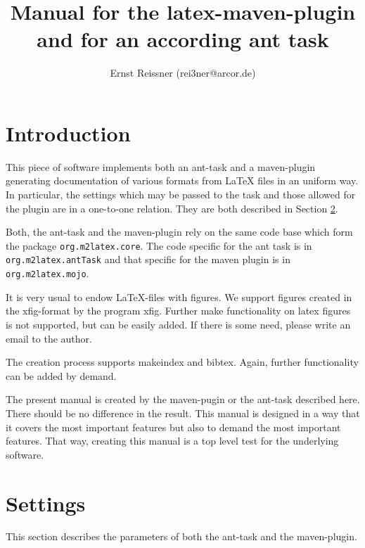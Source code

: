 \documentclass[12pt]{article}
\title{Manual for the latex-maven-plugin and for an according ant task }
\author{Ernst Reissner (rei3ner@arcor.de)}
\begin{document}
\maketitle

\tableofcontents

\section{Introduction}

This piece of software implements both an ant-task and a maven-plugin 
generating documentation of various formats from LaTeX files 
in an uniform way. 
In particular, the settings which may be passed to the task 
and those allowed for the plugin are in a one-to-one relation. 
They are both described in Section \ref{sec:settings}. 

Both, the ant-task and the maven-plugin rely on the same code base 
which form the package {\tt org.m2latex.core}. 
The code specific for the ant task is in {\tt org.m2latex.antTask} 
and that specific for the maven plugin is in {\tt org.m2latex.mojo}. 

It is very usual to endow LaTeX-files with figures. 
We support figures created in the xfig-format 
by the program xfig. 
Further make functionality on latex figures is not supported, 
but can be easily added. 
If there is some need, please write an email to the author. 

The creation process supports makeindex and bibtex. 
Again, further functionality can be added by demand. 

The present manual is created by the maven-pugin or the ant-task 
described here. 
There should be no difference in the result. 
This manual is designed in a way that it covers the most important features 
but also to demand the most important features. 
That way, creating this manual is a top level test 
for the underlying software. 


\section{Settings}\label{sec:settings}

This section describes the parameters 
of both the ant-task and the maven-plugin. 
\end{document}
